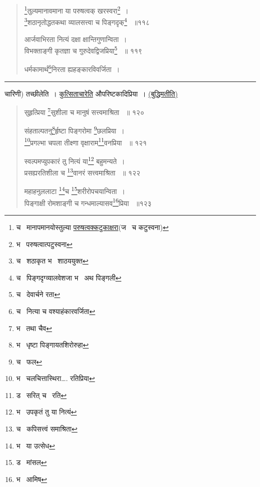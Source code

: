 \documentclass[11pt, openany]{book}
\begin{document}
{\begin{quote}
{\renewcommand{\thefootnote}{14}\footnote{च \textendash\ मानापमानयोस्तुल्या \underline{परुषत्वक्कटुकाक्षरा}(ज \textendash\ च कटुस्वना) }तुल्यमानावमाना या परुषत्वक् खरस्वरा\renewcommand{\thefootnote}{15}\footnote{भ \textendash\ परुषत्वात्पटुस्वना }~।\\
\renewcommand{\thefootnote}{16}\footnote{च \textendash\ शठाकृत भ \textendash\ शाठययुक्त}शठानृतोद्धतकथा व्यालसत्त्वा च पिङ्गदृक्\renewcommand{\thefootnote}{17}\footnote{च \textendash\ पिङ्गदृग्व्यालवेशजा भ \textendash\ अथ पिङ्गली } ~॥११८ 

आर्जवाभिरता नित्यं दक्षा क्षान्तिगुणान्विता~। \\
विभक्ताङ्गी कृतज्ञा च गुरुदेवद्विजप्रिया\renewcommand{\thefootnote}{18}\footnote{च \textendash\ देवार्चने रता} ~॥ ११९ 

धर्मकामार्थ\renewcommand{\thefootnote}{19}\footnote{च \textendash\ नित्या च वश्याहंकारवर्जिता }निरता ह्यहङ्कारविवर्जिता~। }
\end{quote}

\hrule

\vspace{2mm}

\noindent
चारिणी) तच्छीलेति~। \underline{कुत्सिताचारेति} औपरिष्टकादिप्रिया~। \underline{(बुद्धिमतीति) }


\newpage

\begin{quote}
 {\na सुहृत्प्रिया \renewcommand{\thefootnote}{1}\footnote{भ \textendash\ तथा चैव}सुशीला च मानुषं सत्त्वमाश्रिता ~॥ १२० 

संहताल्पतनु\renewcommand{\thefootnote}{2}\footnote{भ \textendash\ धृष्टा पिङ्गायतशिरोरुहा}र्हृष्टा पिङ्गरोमा \renewcommand{\thefootnote}{3}\footnote{च \textendash\ फल }छलप्रिया~। \\
\renewcommand{\thefootnote}{4}\footnote{भ \textendash\ चलचित्तास्थिरा\ldots . रतिप्रिया}प्रगल्भा चपला तीक्ष्णा वृक्षाराम\renewcommand{\thefootnote}{5}\footnote{ड \textendash\ सरित् च \textendash\ रति }वनप्रिया ~॥ १२१ 

स्वल्पमप्युपकारं तु नित्यं या\renewcommand{\thefootnote}{6}\footnote{भ \textendash\ उपकृतं तु या नित्यं} बहुमन्यते~।\\ 
प्रसह्यरतिशीला च \renewcommand{\thefootnote}{7}\footnote{च \textendash\ कपिसत्त्वं समाश्रिता}वानरं सत्त्वमाश्रिता ~॥ १२२ 

महाहनुललाटा \renewcommand{\thefootnote}{8}\footnote{भ \textendash\ या उत्सेध}च \renewcommand{\thefootnote}{9}\footnote{ड \textendash\ मांसल }शरीरोपचयान्विता~।\\ 
पिङ्गाक्षी रोमशाङ्गी च गन्धमाल्यासव\renewcommand{\thefootnote}{10}\footnote{भ \textendash\ आमिष }प्रिया ~॥१२३ 

}
\end{quote}}
\end{document}
